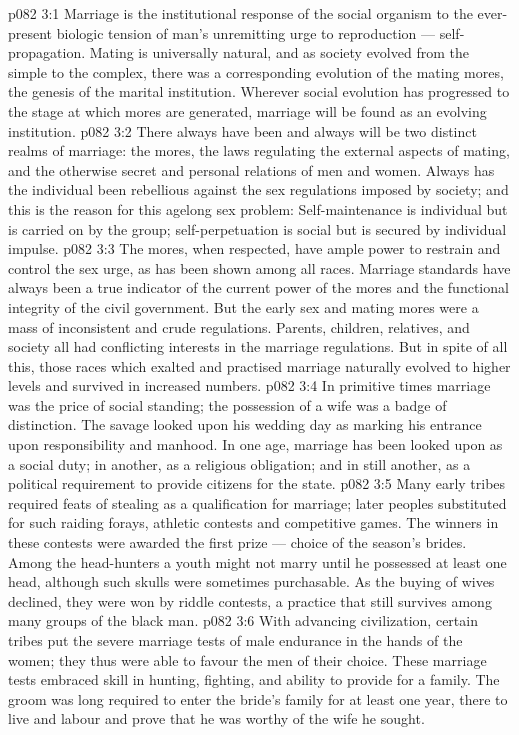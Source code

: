 \vs p082 3:1 Marriage is the institutional response of the social organism to the ever\hyp{}present biologic tension of man’s unremitting urge to reproduction --- self\hyp{}propagation. Mating is universally natural, and as society evolved from the simple to the complex, there was a corresponding evolution of the mating mores, the genesis of the marital institution. Wherever social evolution has progressed to the stage at which mores are generated, marriage will be found as an evolving institution.
\vs p082 3:2 There always have been and always will be two distinct realms of marriage: the mores, the laws regulating the external aspects of mating, and the otherwise secret and personal relations of men and women. Always has the individual been rebellious against the sex regulations imposed by society; and this is the reason for this agelong sex problem: Self\hyp{}maintenance is individual but is carried on by the group; self\hyp{}perpetuation is social but is secured by individual impulse.
\vs p082 3:3 The mores, when respected, have ample power to restrain and control the sex urge, as has been shown among all races. Marriage standards have always been a true indicator of the current power of the mores and the functional integrity of the civil government. But the early sex and mating mores were a mass of inconsistent and crude regulations. Parents, children, relatives, and society all had conflicting interests in the marriage regulations. But in spite of all this, those races which exalted and practised marriage naturally evolved to higher levels and survived in increased numbers.
\vs p082 3:4 \pc In primitive times marriage was the price of social standing; the possession of a wife was a badge of distinction. The savage looked upon his wedding day as marking his entrance upon responsibility and manhood. In one age, marriage has been looked upon as a social duty; in another, as a religious obligation; and in still another, as a political requirement to provide citizens for the state.
\vs p082 3:5 Many early tribes required feats of stealing as a qualification for marriage; later peoples substituted for such raiding forays, athletic contests and competitive games. The winners in these contests were awarded the first prize --- choice of the season’s brides. Among the head\hyp{}hunters a youth might not marry until he possessed at least one head, although such skulls were sometimes purchasable. As the buying of wives declined, they were won by riddle contests, a practice that still survives among many groups of the black man.
\vs p082 3:6 With advancing civilization, certain tribes put the severe marriage tests of male endurance in the hands of the women; they thus were able to favour the men of their choice. These marriage tests embraced skill in hunting, fighting, and ability to provide for a family. The groom was long required to enter the bride’s family for at least one year, there to live and labour and prove that he was worthy of the wife he sought.
